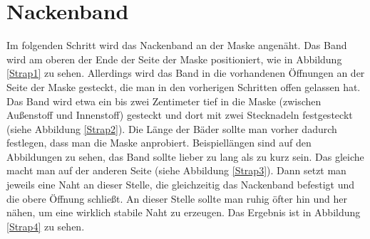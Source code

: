 \documentclass[12pt,parskip=full]{scrartcl}
\begin{document}
\section{Nackenband}
Im folgenden Schritt wird das Nackenband an der Maske angenäht. Das Band wird am oberen der Ende der Seite der Maske positioniert, wie in Abbildung \ref{Strap1} zu sehen. Allerdings wird das Band in die vorhandenen Öffnungen an der Seite der Maske gesteckt, die man in den vorherigen Schritten offen gelassen hat. Das Band wird etwa ein bis zwei Zentimeter tief in die Maske (zwischen Außenstoff und Innenstoff) gesteckt und dort mit zwei Stecknadeln festgesteckt (siehe Abbildung \ref{Strap2}). Die Länge der Bäder sollte man vorher dadurch festlegen, dass man die Maske anprobiert. Beispiellängen sind auf den Abbildungen zu sehen, das Band sollte lieber zu lang als zu kurz sein. Das gleiche macht man auf der anderen Seite (siehe Abbildung \ref{Strap3}). Dann setzt man jeweils eine Naht an dieser Stelle, die gleichzeitig das Nackenband befestigt und die obere Öffnung schließt. An dieser Stelle sollte man ruhig öfter hin und her nähen, um eine wirklich stabile Naht zu erzeugen. Das Ergebnis ist in Abbildung \ref{Strap4} zu sehen. 
\end{document}
